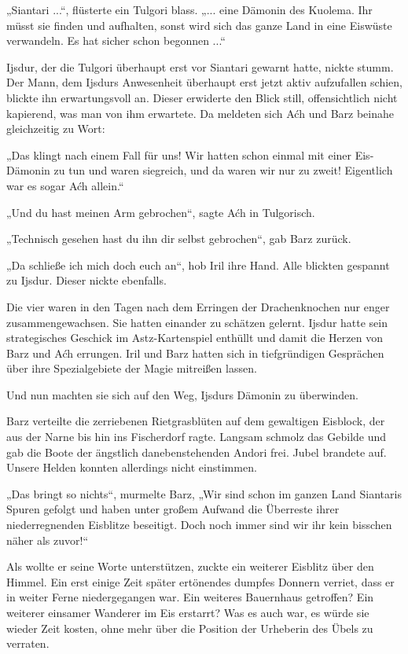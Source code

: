 „Siantari ...“, flüsterte ein Tulgori blass. „... eine Dämonin des Kuolema. Ihr müsst sie finden und aufhalten, sonst wird sich das ganze Land in eine Eiswüste verwandeln. Es hat sicher schon begonnen ...“

Ijsdur, der die Tulgori überhaupt erst vor Siantari gewarnt hatte, nickte stumm. Der Mann, dem Ijsdurs Anwesenheit überhaupt erst jetzt aktiv aufzufallen schien, blickte ihn erwartungsvoll an. Dieser erwiderte den Blick still, offensichtlich nicht kapierend, was man von ihm erwartete. Da meldeten sich Aćh und Barz beinahe gleichzeitig zu Wort:

„Das klingt nach einem Fall für uns! Wir hatten schon einmal mit einer Eis-Dämonin zu tun und waren siegreich, und da waren wir nur zu zweit! Eigentlich war es sogar Aćh allein.“

„Und du hast meinen Arm gebrochen“, sagte Aćh in Tulgorisch.

„Technisch gesehen hast du ihn dir selbst gebrochen“, gab Barz zurück.

„Da schließe ich mich doch euch an“, hob Iril ihre Hand. Alle blickten gespannt zu Ijsdur. Dieser nickte ebenfalls.

Die vier waren in den Tagen nach dem Erringen der Drachenknochen nur enger zusammengewachsen. Sie hatten einander zu schätzen gelernt. Ijsdur hatte sein strategisches Geschick im Astz-Kartenspiel enthüllt und damit die Herzen von Barz und Aćh errungen. Iril und Barz hatten sich in tiefgründigen Gesprächen über ihre Spezialgebiete der Magie mitreißen lassen.

Und nun machten sie sich auf den Weg, Ijsdurs Dämonin zu überwinden.\bigskip







Barz verteilte die zerriebenen Rietgrasblüten auf dem gewaltigen Eisblock, der aus der Narne bis hin ins Fischerdorf ragte. Langsam schmolz das Gebilde und gab die Boote der ängstlich danebenstehenden Andori frei. Jubel brandete auf. Unsere Helden konnten allerdings nicht einstimmen.

„Das bringt so nichts“, murmelte Barz, „Wir sind schon im ganzen Land Siantaris Spuren gefolgt und haben unter großem Aufwand die Überreste ihrer niederregnenden Eisblitze beseitigt. Doch noch immer sind wir ihr kein bisschen näher als zuvor!“

Als wollte er seine Worte unterstützen, zuckte ein weiterer Eisblitz über den Himmel. Ein erst einige Zeit später ertönendes dumpfes Donnern verriet, dass er in weiter Ferne niedergegangen war. Ein weiteres Bauernhaus getroffen? Ein weiterer einsamer Wanderer im Eis erstarrt? Was es auch war, es würde sie wieder Zeit kosten, ohne mehr über die Position der Urheberin des Übels zu verraten.

